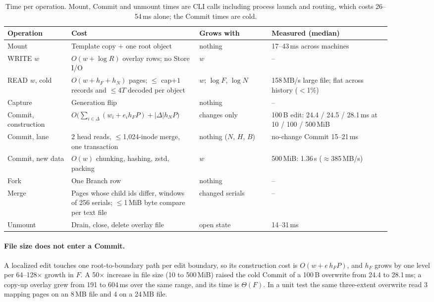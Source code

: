 \begin{table}[h]
\centering
\small
\begin{tabular}{p{0.15\linewidth} p{0.30\linewidth} p{0.17\linewidth} p{0.28\linewidth}}
\toprule
Operation & Cost & Grows with & Measured (median) \\
\midrule
Mount & Template copy $+$ one root object & nothing & 17--43\,ms across machines \\
WRITE $w$ & $O(w + \log R)$ overlay rows; no Store I/O & $w$ & -- \\
READ $w$, cold & $O(w + h_F + h_N)$ pages; $\leq$ cap$+1$ records and $\leq 4T$ decoded per object & $w$; $\log F$, $\log N$ & 158\,MB/s large file; flat across history ($<$1\%) \\
Capture & Generation flip & nothing & -- \\
Commit, construction & $O\big(\sum_{i\in\Delta}(w_i + e_i h_F P) + |\Delta| h_N P\big)$ & changes only & 100\,B edit: 24.4 / 24.5 / 28.1\,ms at 10 / 100 / 500\,MiB \\
Commit, lane & 2 head reads, $\leq$1,024-inode merge, one transaction & nothing ($N$, $H$, $B$) & no-change Commit 15--21\,ms \\
Commit, new data & $O(w)$ chunking, hashing, zstd, packing & $w$ & 500\,MiB: 1.36\,s ($\approx$385\,MB/s) \\
Fork & One Branch row & nothing & -- \\
Merge & Pages whose child ids differ, windows of 256 serials; $\leq$1\,MiB byte compare per text file & changed serials & -- \\
Unmount & Drain, close, delete overlay file & open state & 14--31\,ms \\
\bottomrule
\end{tabular}
\caption{Time per operation. Mount, Commit and unmount times are CLI calls including
process launch and routing, which costs 26--54\,ms alone; the Commit times are cold.}
\label{tab:time}
\end{table}

\paragraph{File size does not enter a Commit.} A localized edit touches one
root-to-boundary path per edit boundary, so its construction cost is $O(w + e\,h_F P)$,
and $h_F$ grows by one level per 64--128$\times$ growth in $F$. A 50$\times$ increase in
file size (10 to 500\,MiB) raised the cold Commit of a 100\,B overwrite from 24.4 to
28.1\,ms; a copy-up overlay grew from 191 to 604\,ms over the same range, and its time is
$\Theta(F)$. In a unit test the same three-extent overwrite read 3 mapping pages on an
8\,MB file and 4 on a 24\,MB file.

